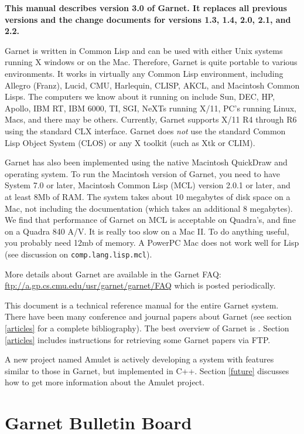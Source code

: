 \documentclass{report}
\begin{document}
{\bf This manual describes version 3.0 of Garnet.  It replaces all
  previous versions and the change documents for versions 1.3, 1.4,
  2.0, 2.1, and 2.2.}

Garnet is written in Common Lisp and can be used with either Unix
systems running X windows or on the Mac.  Therefore, Garnet is quite
portable to various environments.  It works in virtually any Common
Lisp environment, including Allegro (Franz), Lucid, CMU, Harlequin,
CLISP, AKCL, and Macintosh Common Lisps.  The computers we know about
it running on include Sun, DEC, HP, Apollo, IBM RT, IBM 6000, TI, SGI,
NeXTs running X/11, PC's running Linux, Macs, and there may be others.
Currently, Garnet supports X/11 R4 through R6 using the standard CLX
interface.  Garnet does {\it not} use the standard Common Lisp Object
System (CLOS) or any X toolkit (such as Xtk or CLIM).

Garnet has also been implemented using the native Macintosh QuickDraw
and operating system.  To run the Macintosh version of Garnet, you
need to have System 7.0 or later, Macintosh Common Lisp (MCL) version
2.0.1 or later, and at least 8Mb of RAM.  The system takes about 10
megabytes of disk space on a Mac, not including the documentation
(which takes an additional 8 megabytes).  We find that performance of
Garnet on MCL is acceptable on Quadra's, and fine on a Quadra 840 A/V.
It is really too slow on a Mac II.  To do anything useful, you
probably need 12mb of memory.  A PowerPC Mac does not work well for
Lisp (see discussion on \texttt{comp.lang.lisp.mcl}).

More details about Garnet are available in the Garnet FAQ:
\url{ftp://a.gp.cs.cmu.edu/usr/garnet/garnet/FAQ} which is
posted periodically.

This document is a technical reference manual for the entire Garnet
system.  There have been many conference and journal papers about
Garnet (see section \ref{articles} for a complete bibliography).  The
best overview of Garnet is \cite{GarnetIEEE}.  Section \ref{articles}
includes instructions for retrieving some Garnet papers via FTP.

 A new project named Amulet is actively developing a
system with features similar to those in Garnet, but implemented in
C++.  Section \ref{future} discusses how to get more information about
the Amulet project.


\section{Garnet Bulletin Board}
  
\end{document}
